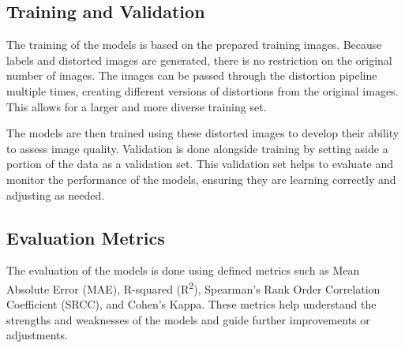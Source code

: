 \subsection{Training and Validation}
\label{sub:TrainVal}
The training of the models is based on the prepared training images. Because labels and distorted images are generated, there is no restriction on the original number of images. The images can be passed through the distortion pipeline multiple times, creating different versions of distortions from the original images. This allows for a larger and more diverse training set.\par 
\vspace{\baselineskip}
\noindent
The models are then trained using these distorted images to develop their ability to assess image quality. Validation is done alongside training by setting aside a portion of the data as a validation set. This validation set helps to evaluate and monitor the performance of the models, ensuring they are learning correctly and adjusting as needed. \par

\subsection{Evaluation Metrics}
\label{sub:EvaluationMetrics}
The evaluation of the models is done using defined metrics such as Mean Absolute Error (MAE), R-squared (R\textsuperscript{2}), Spearman’s Rank Order Correlation Coefficient (SRCC), and Cohen’s Kappa. These metrics help understand the strengths and weaknesses of the models and guide further improvements or adjustments. \par
